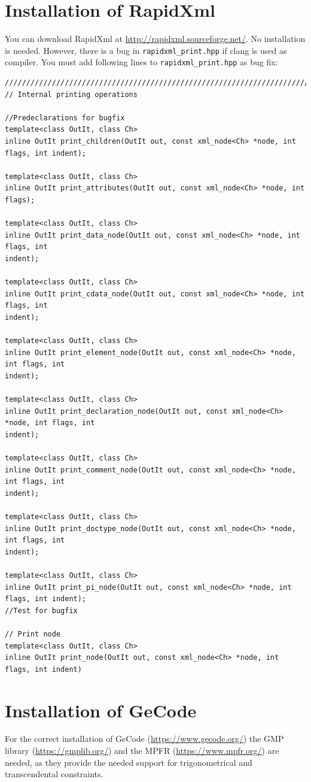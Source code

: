 \section{Installation of RapidXml}
You can download RapidXml at \url{http://rapidxml.sourceforge.net/}.
No installation is needed. However, there is a bug in {\tt rapidxml\_print.hpp} if clang is used as compiler. You must add following lines to {\tt rapidxml\_print.hpp} as bug fix:
\begin{lstlisting}[basicstyle=\ttfamily\scriptsize,backgroundcolor={\color{gray!30}}, escapechar=!]
///////////////////////////////////////////////////////////////////////////
// Internal printing operations

//Predeclarations for bugfix
template<class OutIt, class Ch>
inline OutIt print_children(OutIt out, const xml_node<Ch> *node, int flags, int indent);

template<class OutIt, class Ch>
inline OutIt print_attributes(OutIt out, const xml_node<Ch> *node, int flags);

template<class OutIt, class Ch>
inline OutIt print_data_node(OutIt out, const xml_node<Ch> *node, int flags, int 
indent);

template<class OutIt, class Ch>
inline OutIt print_cdata_node(OutIt out, const xml_node<Ch> *node, int flags, int 
indent);

template<class OutIt, class Ch>
inline OutIt print_element_node(OutIt out, const xml_node<Ch> *node, int flags, int 
indent);

template<class OutIt, class Ch>
inline OutIt print_declaration_node(OutIt out, const xml_node<Ch> *node, int flags, int 
indent);

template<class OutIt, class Ch>
inline OutIt print_comment_node(OutIt out, const xml_node<Ch> *node, int flags, int 
indent);

template<class OutIt, class Ch>
inline OutIt print_doctype_node(OutIt out, const xml_node<Ch> *node, int flags, int 
indent);

template<class OutIt, class Ch>
inline OutIt print_pi_node(OutIt out, const xml_node<Ch> *node, int flags, int indent);
//Test for bugfix

// Print node
template<class OutIt, class Ch>
inline OutIt print_node(OutIt out, const xml_node<Ch> *node, int flags, int indent)
\end{lstlisting}


\section{Installation of GeCode}
For the correct installation of GeCode (\url{https://www.gecode.org/}) the GMP library (\url{https://gmplib.org/}) and  the MPFR (\url{https://www.mpfr.org/}) are needed, as they provide the needed support for trigonometrical and transcendental constraints.

